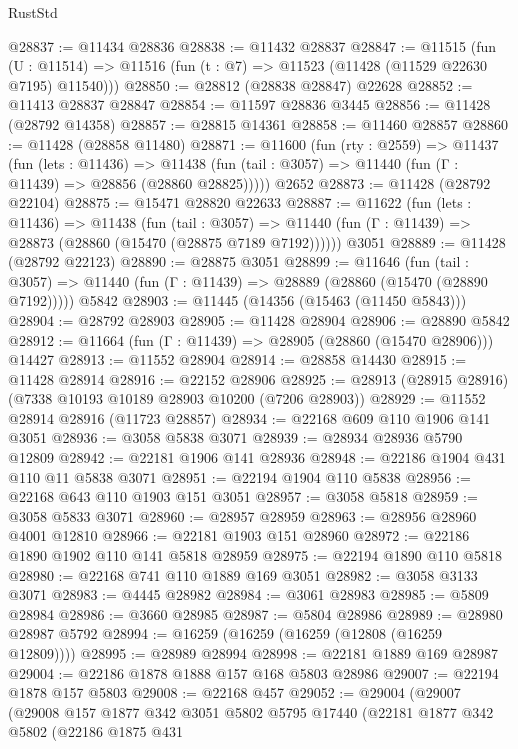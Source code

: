 \begin{lexlean}{RustStd}
\begin{coremodule}
@28837 := @11434 @28836
@28838 := @11432 @28837
@28847 := @11515
    (fun (U : @11514) => @11516 (fun (t : @7) => @11523 (@11428 (@11529 @22630 @7195) @11540)))
@28850 := @28812 (@28838 @28847) @22628
@28852 := @11413 @28837 @28847
@28854 := @11597 @28836 @3445
@28856 := @11428 (@28792 @14358)
@28857 := @28815 @14361
@28858 := @11460 @28857
@28860 := @11428 (@28858 @11480)
@28871 := @11600
    (fun (rty : @2559) =>
    @11437
      (fun (lets : @11436) =>
      @11438 (fun (tail : @3057) => @11440 (fun (Γ : @11439) => @28856 (@28860 @28825)))))
    @2652
@28873 := @11428 (@28792 @22104)
@28875 := @15471 @28820 @22633
@28887 := @11622
    (fun (lets : @11436) =>
    @11438
      (fun (tail : @3057) =>
      @11440 (fun (Γ : @11439) => @28873 (@28860 (@15470 (@28875 @7189 @7192))))))
    @3051
@28889 := @11428 (@28792 @22123)
@28890 := @28875 @3051
@28899 := @11646
    (fun (tail : @3057) => @11440 (fun (Γ : @11439) => @28889 (@28860 (@15470 (@28890 @7192)))))
    @5842
@28903 := @11445 (@14356 (@15463 (@11450 @5843)))
@28904 := @28792 @28903
@28905 := @11428 @28904
@28906 := @28890 @5842
@28912 := @11664 (fun (Γ : @11439) => @28905 (@28860 (@15470 @28906))) @14427
@28913 := @11552 @28904
@28914 := @28858 @14430
@28915 := @11428 @28914
@28916 := @22152 @28906
@28925 := @28913 (@28915 @28916) (@7338 @10193 @10189 @28903 @10200 (@7206 @28903))
@28929 := @11552 @28914 @28916 (@11723 @28857)
@28934 := @22168 @609 @110 @1906 @141 @3051
@28936 := @3058 @5838 @3071
@28939 := @28934 @28936 @5790 @12809
@28942 := @22181 @1906 @141 @28936
@28948 := @22186 @1904 @431 @110 @11 @5838 @3071
@28951 := @22194 @1904 @110 @5838
@28956 := @22168 @643 @110 @1903 @151 @3051
@28957 := @3058 @5818
@28959 := @3058 @5833 @3071
@28960 := @28957 @28959
@28963 := @28956 @28960 @4001 @12810
@28966 := @22181 @1903 @151 @28960
@28972 := @22186 @1890 @1902 @110 @141 @5818 @28959
@28975 := @22194 @1890 @110 @5818
@28980 := @22168 @741 @110 @1889 @169 @3051
@28982 := @3058 @3133 @3071
@28983 := @4445 @28982
@28984 := @3061 @28983
@28985 := @5809 @28984
@28986 := @3660 @28985
@28987 := @5804 @28986
@28989 := @28980 @28987 @5792
@28994 := @16259 (@16259 (@16259 (@12808 (@16259 @12809))))
@28995 := @28989 @28994
@28998 := @22181 @1889 @169 @28987
@29004 := @22186 @1878 @1888 @157 @168 @5803 @28986
@29007 := @22194 @1878 @157 @5803
@29008 := @22168 @457
@29052 := @29004
    (@29007
      (@29008
        @157
        @1877
        @342
        @3051
        @5802
        @5795
        @17440
        (@22181
          @1877
          @342
          @5802
          (@22186
            @1875
            @431

\end{coremodule}
\end{lexlean}
